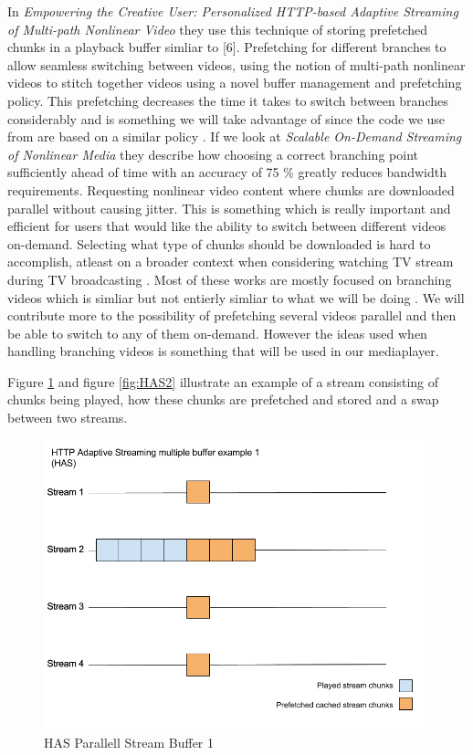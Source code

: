 \documentclass[9pt,a4paper]{acmproc}
\begin{document}
In \textit{Empowering the Creative User: Personalized HTTP-based Adaptive Streaming of Multi-path Nonlinear Video} they use this technique of storing prefetched chunks in a playback buffer simliar to [6]. Prefetching for different branches to allow seamless switching between videos, using the notion of multi-path nonlinear videos to stitch together videos using a novel buffer management and prefetching policy. This prefetching decreases the time it takes to switch between branches considerably and is something we will take advantage of since the code we use from \cite{qualbranch} are based on a similar policy \cite{hasmultipath}. If we look at \textit{Scalable On-Demand Streaming of 
Nonlinear Media} they describe how choosing a correct branching point sufficiently ahead of time with an accuracy of 75 \% greatly reduces bandwidth requirements. Requesting nonlinear video content where chunks are downloaded parallel without causing jitter. This is something which is really important and efficient for users that would like the ability to switch between different videos on-demand. Selecting what type of chunks should be downloaded is hard to accomplish, atleast on a broader context when considering watching TV stream during TV broadcasting \cite{scalableOnDemand}.  Most of these works are mostly focused on branching videos which is simliar but not entierly simliar to what we will be doing \cite{qualbranch, hasmultipath,scalableOnDemand}. We will contribute more to the possibility of prefetching several videos parallel and then be able to switch to any of  them on-demand. However the ideas used when handling branching videos is something that will be used in our mediaplayer.

Figure \ref{fig:HAS1} and figure \ref{fig:HAS2} illustrate an example of a stream consisting of chunks being played, how these chunks are prefetched and stored and a swap between two streams.

\begin{figure}[!ht]
\begin{center}
\includegraphics[scale=0.3]{HAS1.png}
\caption{HAS Parallell Stream Buffer 1}
\label{fig:HAS1}
\end{center}
\end{figure}
\end{document}
